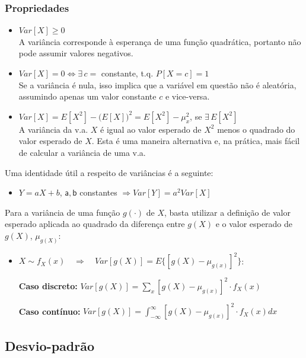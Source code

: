 \documentclass[
]{book}
\providecommand{\tightlist}{%
  \setlength{\itemsep}{0pt}\setlength{\parskip}{0pt}}
\theoremstyle{definition}
\theoremstyle{definition}
\theoremstyle{definition}
\theoremstyle{remark}
\begin{document}
\hypertarget{propriedades-3}{%
\subsubsection*{Propriedades}\label{propriedades-3}}

\begin{itemize}
\item
  \({Var[X] \geq 0}\)\\
  A variância corresponde à esperança de uma função quadrática, portanto não pode assumir valores negativos.
\item
  \({Var[X] = 0 \iff \exists \, c=}\) constante, t.q. \({P[X=c]=1}\)\\
  Se a variância é nula, isso implica que a variável em questão não é aleatória, assumindo apenas um valor constante \(c\) e vice-versa.
\item
  \({Var[X] = E[X^2] -\big(E[X]\big)^2 = E[X^2] - \mu_x^2}\), se \({\exists \, E[X^2]}\)\\
  A variância da v.a. \(X\) é igual ao valor esperado de \(X^2\) menos o quadrado do valor esperado de \(X\). Esta é uma maneira alternativa e, na prática, mais fácil de calcular a variância de uma v.a.
\end{itemize}

Uma identidade útil a respeito de variâncias é a seguinte:

\begin{itemize}
\tightlist
\item
  \({Y = aX+b}\), \(\mathsf{a,b}\) constantes \({\Longrightarrow Var[Y] = a^2 Var[X]}\)
\end{itemize}

Para a variância de uma função \(g(\cdot)\) de \(X\), basta utilizar a definição de valor esperado aplicada ao quadrado da diferença entre \(g(X)\) e o valor esperado de \(g(X)\), \(\mu_{g(X)}\):

\begin{itemize}
\item
  \({X \sim f_X(x) \quad \Longrightarrow \quad Var[g(X)] = E\{[g(X) - \mu_{g(x)}]^2\}}\):

  \textbf{Caso discreto:} \({Var[g(X)] = \sum_x [g(X) - \mu_{g(x)}]^2 \cdot f_X(x)}\)

  \textbf{Caso contínuo:} \({Var [g(X)] = \int_{-\infty}^{\infty} [g(X) - \mu_{g(x)}]^2 \cdot f_X(x) dx}\)
\end{itemize}

\hypertarget{desvio-padruxe3o}{%
\subsection*{Desvio-padrão}\label{desvio-padruxe3o}}
\end{document}
